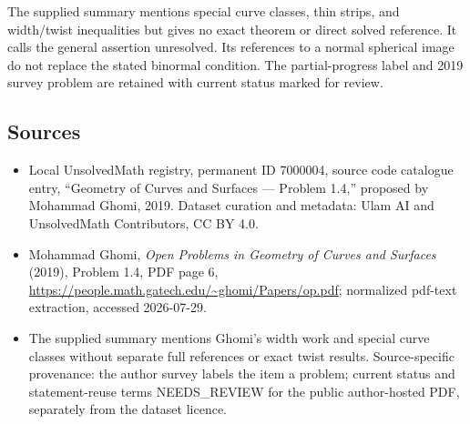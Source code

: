 \documentclass[11pt]{article}
\begin{document}
The supplied summary mentions special curve classes, thin strips, and width/twist inequalities but gives no exact theorem or direct solved reference. It calls the general assertion unresolved. Its references to a normal spherical image do not replace the stated binormal condition. The partial-progress label and 2019 survey problem are retained with current status marked for review.
\subsection{Sources}
\begin{itemize}
\item Local UnsolvedMath registry, permanent ID 7000004, source code catalogue entry, ``Geometry of Curves and Surfaces --- Problem 1.4,'' proposed by Mohammad Ghomi, 2019. Dataset curation and metadata: Ulam AI and UnsolvedMath Contributors, CC BY 4.0.
\item Mohammad Ghomi, \emph{Open Problems in Geometry of Curves and Surfaces} (2019), Problem 1.4, PDF page 6, \url{https://people.math.gatech.edu/~ghomi/Papers/op.pdf}; normalized pdf-text extraction, accessed 2026-07-29.
\item The supplied summary mentions Ghomi's width work and special curve classes without separate full references or exact twist results. Source-specific provenance: the author survey labels the item a problem; current status and statement-reuse terms NEEDS\_REVIEW for the public author-hosted PDF, separately from the dataset licence.
\end{itemize}
\end{document}
